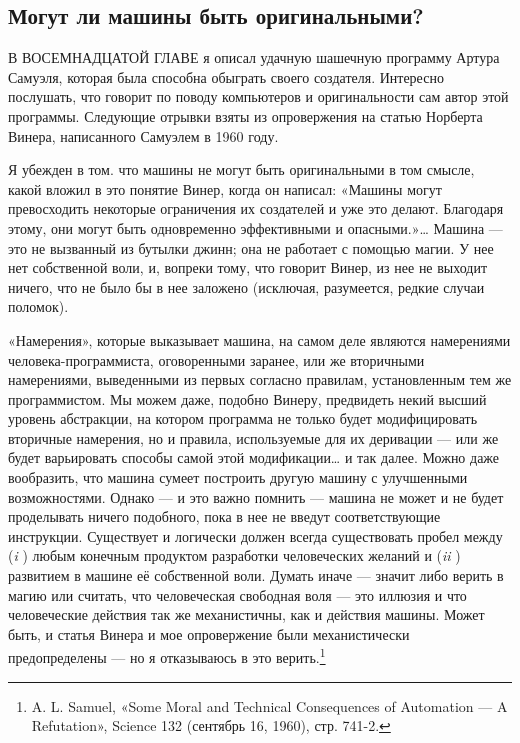 \documentclass[../main.tex]{subfiles}
\begin{document}

\subsection{Могут ли машины быть оригинальными?}

В ВОСЕМНАДЦАТОЙ ГЛАВЕ я описал удачную шашечную программу Артура Самуэля, которая была способна обыграть своего создателя. Интересно послушать, что говорит по поводу компьютеров и оригинальности сам автор этой программы. Следующие отрывки взяты из опровержения на статью Норберта Винера, написанного Самуэлем в 1960 году.

Я убежден в том. что машины не могут быть оригинальными в том смысле, какой вложил в это понятие Винер, когда он написал: «Машины могут превосходить некоторые ограничения их создателей и уже это делают. Благодаря этому, они могут быть одновременно эффективными и опасными.»\ldots{} Машина --- это не вызванный из бутылки джинн; она не работает с помощью магии. У нее нет собственной воли, и, вопреки тому, что говорит Винер, из нее не выходит ничего, что не было бы в нее заложено (исключая, разумеется, редкие случаи поломок).

«Намерения», которые выказывает машина, на самом деле являются намерениями человека-программиста, оговоренными заранее, или же вторичными намерениями, выведенными из первых согласно правилам, установленным тем же программистом. Мы можем даже, подобно Винеру, предвидеть некий высший уровень абстракции, на котором программа не только будет модифицировать вторичные намерения, но и правила, используемые для их деривации --- или же будет варьировать способы самой этой модификации\ldots{} и так далее. Можно даже вообразить, что машина сумеет построить другую машину с улучшенными возможностями. Однако --- и это важно помнить --- машина не может и не будет проделывать ничего подобного, пока в нее не введут соответствующие инструкции. Существует и логически должен всегда существовать пробел между (\emph{i} ) любым конечным продуктом разработки человеческих желаний и (\emph{ii} ) развитием в машине её собственной воли. Думать иначе --- значит либо верить в магию или считать, что человеческая свободная воля --- это иллюзия и что человеческие действия так же механистичны, как и действия машины. Может быть, и статья Винера и мое опровержение были механистически предопределены --- но я отказываюсь в это верить.\footnote{A. L. Samuel, «Some Moral and Technical Consequences of Automation --- A Refutation», Science 132 (сентябрь 16, 1960), стр. 741-2.}
\end{document}
